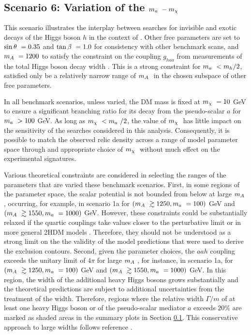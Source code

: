 \subsection{Scenario 6: Variation of the \texorpdfstring{$m_a~-m_{\chi}~$}{TEXT} }
\label{subsection:ma-mchi-scan}
This scenario illustrates the interplay between searches for invisible and exotic decays of the Higgs boson $h$ in the context of \hdma. Other free parameters are set to $\sin\theta~=0.35$ and $\tan\beta~=1.0$ for consistency with other benchmark scans, and $m_A~=1200$ to satisfy the constraint on the coupling $g_{haa}$ from measurements of the total Higgs boson decay width \cite{Argyropoulos:2022ezr}. This is a strong constraint for $m_a~<m_h/2$, satisfied only be a relatively narrow range of $m_A~$ in the chosen subspace of other free parameters.

In all benchmark scenarios, unless varied, the DM mass is fixed at $m_{\chi}~=10$ GeV to ensure a significant branching ratio for its decay from the pseudo-scalar $a$ for $m_a~>100$ GeV. As long as $m_{\chi}~<m_a~/2$, the value of $m_{\chi}~$ has little impact on the sensitivity of the searches considered in this analysis. Consequently, it is possible to match the observed relic density across a range of model parameter space through and appropriate choice of $m_{\chi}~$ without much effect on the experimental signatures.

Various theoretical constraints are considered in selecting the ranges of the parameters that are varied these benchmark scenarios. First, in some regions of the parameter space, the scalar potential is not bounded from below at large $m_A~$, occurring, for example, in scenario 1a for $(m_A~\gtrsim1250,m_a~=100)$ GeV and $(m_A~\gtrsim1550,m_a~=1000)$ GeV. However, these constraints could be substantially relaxed if the quartic couplings take values closer to the perturbative limit or in more general 2HDM models \cite{2HDMWGproxi,Bauer:2017ota,Haisch:2018djm}. Therefore, they should not be understood as a strong limit on the the validity of the model predictions that were used to derive the exclusion contours. Second, given the parameter choices, the $aah$ coupling exceeds the unitary limit of $4\pi$ for large $m_A~$, for instance, in scenario 1a, for $(m_A~\gtrsim1250,m_a~=100)$ GeV and $(m_A~\gtrsim1550,m_a~=1000)$ GeV. In this region, the width of the additional heavy Higgs bosons grows substantially and the theoretical predictions are subject to additional uncertainties from the treatment of the width. Therefore, regions where the relative width $\Gamma/m$ of at least one heavy Higgs boson or of the pseudo-scalar mediator $a$ exceeds $20\%$ are marked as shaded areas in the summary plots in Section \ref{subsection:ma-mchi-scan}. This conservative approach to large widths follows reference \cite{EXOT-2017-32}.

